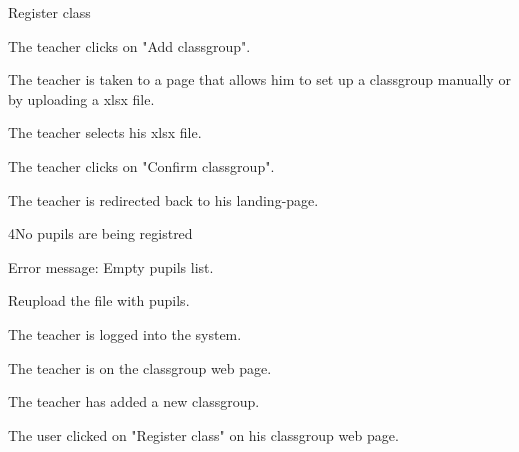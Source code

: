 \begin{uc}{Register class}

    \begin{uc-mss}
    \item The teacher clicks on "Add classgroup".
    \item The teacher is taken to a page that allows him to set up a classgroup manually or by uploading a xlsx file.
    \item The teacher selects his xlsx file.
    \item The teacher clicks on "Confirm classgroup".
    \item The teacher is redirected back to his landing-page.
    \end{uc-mss}

    \begin{uc-ext}

        \begin{uc-fail}{4}{No pupils are being registred}
        \item Error message: Empty pupils list.
        \item Reupload the file with pupils.
        \end{uc-fail}

    \end{uc-ext}

    \begin{uc-pre}
    \item The teacher is logged into the system.
    \item The teacher is on the classgroup web page.
    \end{uc-pre}

    \begin{uc-post}
    \item The teacher has added a new classgroup.
    \end{uc-post}

    \begin{uc-trig}
        The user clicked on "Register class" on his classgroup web page.
    \end{uc-trig}

\end{uc}
